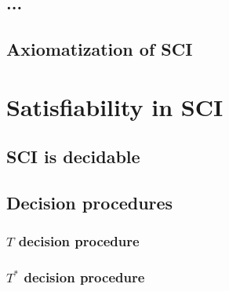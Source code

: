 \documentclass{article}
\theoremstyle{definition}
\newcommand*{\Ts}{T^*}
\begin{document}
\subsection{...}
\subsection{Axiomatization of SCI}
\section{Satisfiability in SCI}
\subsection{SCI is decidable}
\subsection{Decision procedures}
\subsubsection{$T$ decision procedure}
\subsubsection{$\Ts$ decision procedure}
\end{document}
